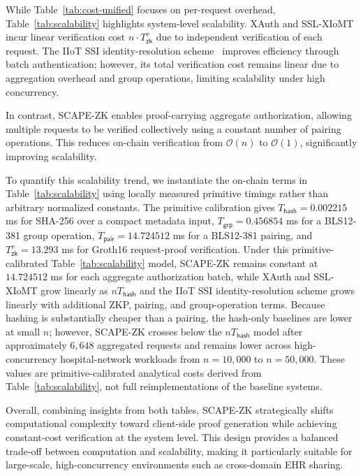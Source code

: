 \documentclass[conference]{IEEEtran}
\begin{document}
While Table~\ref{tab:cost-unified} focuses on per-request overhead, Table~\ref{tab:scalability} highlights system-level scalability. XAuth and SSL-XIoMT incur linear verification cost $n \cdot T_{\mathsf{zk}}^{v}$ due to independent verification of each request. The IIoT SSI identity-resolution scheme~\cite{b30} improves efficiency through batch authentication; however, its total verification cost remains linear due to aggregation overhead and group operations, limiting scalability under high concurrency.

In contrast, SCAPE-ZK enables proof-carrying aggregate authorization, allowing multiple requests to be verified collectively using a constant number of pairing operations. This reduces on-chain verification from $\mathcal{O}(n)$ to $\mathcal{O}(1)$, significantly improving scalability.

To quantify this scalability trend, we instantiate the on-chain terms in Table~\ref{tab:scalability} using locally measured primitive timings rather than arbitrary normalized constants. The primitive calibration gives $T_{\mathsf{hash}}=0.002215$ ms for SHA-256 over a compact metadata input, $T_{\mathsf{grp}}=0.456854$ ms for a BLS12-381 group operation, $T_{\mathsf{pair}}=14.724512$ ms for a BLS12-381 pairing, and $T_{\mathsf{zk}}^{v}=13.293$ ms for Groth16 request-proof verification. Under this primitive-calibrated Table~\ref{tab:scalability} model, SCAPE-ZK remains constant at $14.724512$ ms for each aggregate authorization batch, while XAuth and SSL-XIoMT grow linearly as $nT_{\mathsf{hash}}$ and the IIoT SSI identity-resolution scheme grows linearly with additional ZKP, pairing, and group-operation terms. Because hashing is substantially cheaper than a pairing, the hash-only baselines are lower at small $n$; however, SCAPE-ZK crosses below the $nT_{\mathsf{hash}}$ model after approximately $6{,}648$ aggregated requests and remains lower across high-concurrency hospital-network workloads from $n=10{,}000$ to $n=50{,}000$. These values are primitive-calibrated analytical costs derived from Table~\ref{tab:scalability}, not full reimplementations of the baseline systems.

Overall, combining insights from both tables, SCAPE-ZK strategically shifts computational complexity toward client-side proof generation while achieving constant-cost verification at the system level. This design provides a balanced trade-off between computation and scalability, making it particularly suitable for large-scale, high-concurrency environments such as cross-domain EHR sharing.
\end{document}
